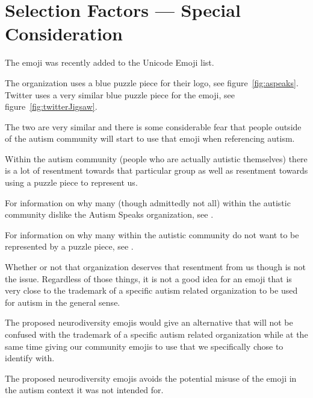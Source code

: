 \section{Selection Factors --- Special Consideration}

The emoji \jigsawemoji{} was recently added to the Unicode Emoji list.

The organization  uses a blue puzzle
piece for their logo, see figure~\ref{fig:aspeaks}. Twitter uses a very similar blue
puzzle piece for the \jigsawemoji{} emoji, see figure~\ref{fig:twitterJigsaw}.

The two are very similar and there is some considerable fear that people outside of the
autism community will start to use that emoji when referencing autism.

Within the autism community (people who are actually autistic themselves) there is a lot of
resentment towards that particular group as well as resentment towards using a puzzle piece
to represent us.

For information on why many (though admittedly not all) within the autistic community dislike
the Autism Speaks organization, see
.

For information on why many within the autistic community do not want to be represented by a
puzzle piece, see
.

Whether or not that organization deserves that resentment from us though is not the issue.
Regardless of those things, it is not a good idea for an emoji that is very close to the
trademark of a specific autism related organization to be used for autism in the general
sense.

The proposed neurodiversity emojis would give an alternative that will not be confused
with the trademark of a specific autism related organization while at the same time giving our
community emojis to use that we specifically chose to identify with.

The proposed neurodiversity emojis avoids the potential misuse of the \jigsawemoji{}
emoji in the autism context it was not intended for.

